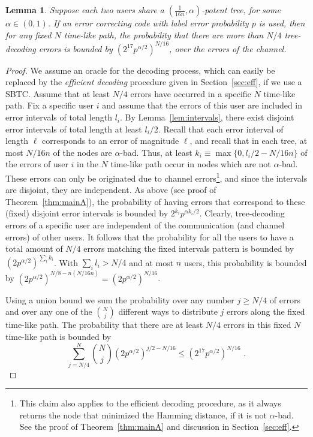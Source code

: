 \documentclass[ letterpaper, 11pt]{article}
\newtheorem{lemma}[theorem]{Lemma}
\newcommand{\potent}{potent\xspace}
\newcommand{\KTC}{\textsf{SBTC}\xspace}
\begin{document}
\begin{lemma}\label{lem:raja}
Suppose each two users share a $(\frac{1}{16n},\alpha)$-\potent tree, for some
 $\alpha\in(0,1)$. If an error correcting code with  label error probability $p$ is used,
then for any fixed $N$ time-like path, the probability that there are more than
$N/4$ tree-decoding errors
is bounded by $(2^{17}p^{\alpha/2})^{N/16}$,
over the errors of the channel.
\end{lemma}
\begin{proof}
We assume an oracle for the decoding process, which can easily be replaced
by the \emph{efficient decoding} procedure
given in Section~\ref{sec:eff}, if we use a \KTC.
Assume that at least $N/4$ errors have occurred in a specific $N$ time-like path.
Fix a specific user $i$ and assume that the errors of this user
are included in error intervals of total length $l_i$.
By Lemma~\ref{lem:intervals}, there exist disjoint error intervals of total length at least $l_i/2$.
Recall that each error interval of length $\ell$ corresponds to an error of magnitude $\ell$,
and recall that in each tree, at most $N/16n$ of the nodes are $\alpha$-bad.
Thus, at least $k_i\equiv\max\{0, l_i/2-N/16n\}$ of the errors of user $i$ in the $N$ time-like path
occur in nodes which are not $\alpha$-bad.
These errors can only be originated due to channel errors\footnote{This claim also applies
    to the efficient decoding procedure, as it
    always returns the node that minimized the Hamming distance,
    if it is not $\alpha$-bad.
    See the proof of Theorem~\ref{thm:mainA}
    and discussion in Section~\ref{sec:eff}.},
and since the intervals are disjoint, they are independent.
As above (see proof of Theorem~\ref{thm:mainA}),
the probability of having errors that correspond to these (fixed) disjoint error intervals
is bounded by $2^{k_i}p^{\alpha k_i/2}$.
Clearly, tree-decoding errors of a specific user are independent
of the communication (and channel errors) of other users.
It follows that the probability for all the users to have
a total amount of $N/4$
errors matching the fixed intervals pattern is bounded by
$(2p^{\alpha/2})^{\sum_{i}k_i}$.
With $\sum_i l_i >N/4$ and at most $n$ users,
this probability is bounded by $(2p^{\alpha/2})^{N/8-n(N/16n)}=(2p^{\alpha/2})^{N/16}$.


Using a union bound we sum the probability over any number $j\ge N/4$ of errors  and
over any one of the  ${N \choose j}$
different ways to distribute $j$ errors along the fixed time-like path.
The probability that there are at least $N/4$
errors in this fixed $N$ time-like path is bounded by
\[
\sum_{j=N/4}^N {N \choose j}(2p^{\alpha/2})^{j/2-N/16} \le  (2^{17}p^{\alpha/2})^{N/16}\text{ .}
\]
\end{proof}
\end{document}
